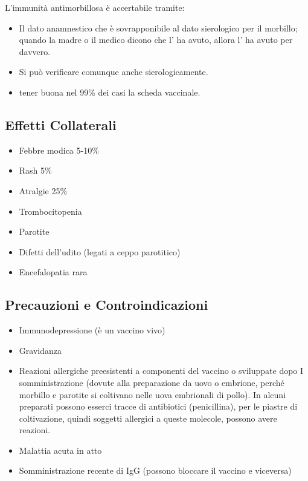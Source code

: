 L'immunità antimorbillosa è accertabile tramite:

\begin{itemize}
\item
  Il dato anamnestico che è sovrapponibile al dato sierologico per il
  morbillo; quando la madre o il medico dicono che l' ha avuto, allora
  l' ha avuto per davvero.
\item
  Si può verificare comunque anche sierologicamente.
\item
  tener buona nel 99\% dei casi la scheda vaccinale.
\end{itemize}

\subsection{Effetti Collaterali}

\begin{itemize}
\item
  Febbre modica 5-10\%
\item
  Rash 5\%
\item
  Atralgie 25\%
\item
  Trombocitopenia
\item
  Parotite
\item
  Difetti dell'udito (legati a ceppo parotitico)
\item
  Encefalopatia rara
\end{itemize}

\subsection{Precauzioni e Controindicazioni}

\begin{itemize}
\item
  Immunodepressione (è un vaccino vivo)
\item
  Gravidanza
\item
Reazioni allergiche preesistenti a
  componenti del vaccino o sviluppate dopo I somministrazione (dovute
  alla preparazione da uovo o embrione, perché morbillo e parotite si
  coltivano nelle uova embrionali di pollo). In alcuni preparati possono
  esserci tracce di antibiotici (penicillina), per le piastre di
  coltivazione, quindi soggetti allergici a queste molecole, possono
  avere reazioni.
\item
  Malattia acuta in atto
\item
  Somministrazione recente di IgG (possono bloccare il vaccino e
  viceversa)
\end{itemize}

